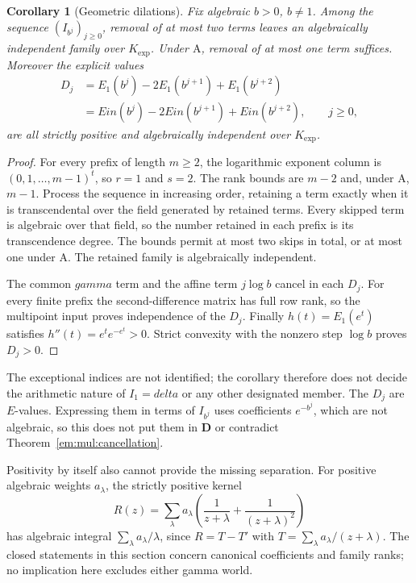 \documentclass[11pt,a4paper]{article}
\DeclareMathOperator{\Ein}{Ein}
\newtheorem{corollary}[theorem]{Corollary}
\theoremstyle{definition}
\theoremstyle{remark}
\theoremstyle{plain}
\numberwithin{equation}{section}
\def\Ein{Ein}\def\gamma{gamma}\def\delta{delta}\def\eta{eta}%
\begin{document}
\begin{corollary}[Geometric dilations]\label{em:mul:geometric}
Fix algebraic $b>0$, $b\ne1$.  Among the sequence
$(I_{b^j})_{j\ge0}$, removal of at most two terms leaves an algebraically
independent family over $K_{\exp}$.  Under $\mathrm A$, removal of at most
one term suffices.  Moreover the explicit values
\begin{align*}
 D_j&=E_1(b^j)-2E_1(b^{j+1})+E_1(b^{j+2})\\
    &=\Ein(b^j)-2\Ein(b^{j+1})+\Ein(b^{j+2}),\qquad j\ge0,
\end{align*}
are all strictly positive and algebraically independent over $K_{\exp}$.
\end{corollary}
\begin{proof}
For every prefix of length $m\ge2$, the logarithmic exponent column is
$(0,1,\ldots,m-1)^t$, so $r=1$ and $s=2$.  The rank bounds are $m-2$
and, under $\mathrm A$, $m-1$.  Process the sequence in increasing order,
retaining a term exactly when it is transcendental over the field
generated by retained terms.  Every skipped term is algebraic over that
field, so the number retained in each prefix is its transcendence degree.
The bounds permit at most two skips in total, or at most one under
$\mathrm A$.  The retained family is algebraically independent.

The common $\gamma$ term and the affine term $j\log b$ cancel in each
$D_j$.  For every finite prefix the second-difference matrix has full
row rank, so the multipoint input proves independence of the $D_j$.
Finally $h(t)=E_1(e^t)$ satisfies
$h''(t)=e^t e^{-e^t}>0$.  Strict convexity with the nonzero step $\log b$
proves $D_j>0$.
\end{proof}
The exceptional indices are not identified; the corollary therefore does
not decide the arithmetic nature of $I_1=\delta$ or any other designated
member.  The $D_j$ are $E$-values.  Expressing them in terms of $I_{b^j}$
uses coefficients $e^{-b^j}$, which are not algebraic, so this does not
put them in $\mathbf D$ or contradict Theorem~\ref{em:mul:cancellation}.

Positivity by itself also cannot provide the missing separation.  For
positive algebraic weights $a_\lambda$, the strictly positive kernel
\[
 R(z)=\sum_\lambda a_\lambda
       \left(\frac1{z+\lambda}+\frac1{(z+\lambda)^2}\right)
\]
has algebraic integral $\sum_\lambda a_\lambda/\lambda$, since
$R=T-T'$ with $T=\sum_\lambda a_\lambda/(z+\lambda)$.
The closed statements in this section concern canonical coefficients
and family ranks; no implication here excludes either gamma world.
\end{document}

